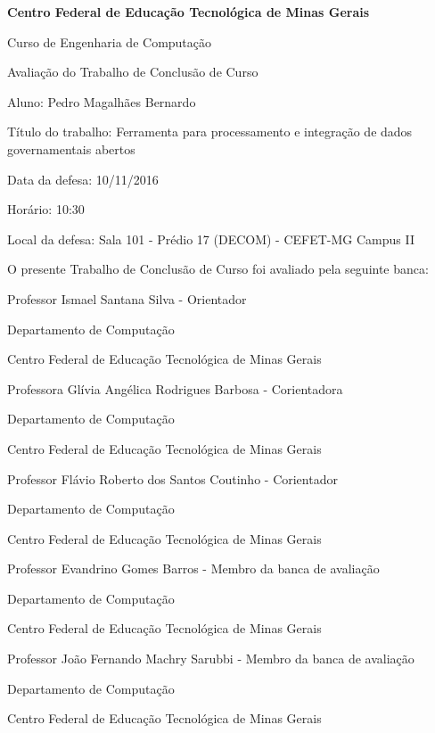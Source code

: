 \centerline{\textbf{Centro Federal de Educação Tecnológica de Minas Gerais}} 

\vspace{10px}

\centerline{Curso de Engenharia de Computação}

\vspace{10px}

\centerline{Avaliação do Trabalho de Conclusão de Curso}


\begin{flushleft}
Aluno: Pedro Magalhães Bernardo

Título do trabalho: Ferramenta para processamento e integração de dados governamentais abertos

Data da defesa: 10/11/2016

Horário: 10:30

Local da defesa: Sala 101 - Prédio 17 (DECOM) - CEFET-MG Campus II
\end{flushleft}

\vspace{10px}


\centerline{O presente Trabalho de Conclusão de Curso foi avaliado pela seguinte banca:}
\vspace{20px}

\centerline{Professor Ismael Santana Silva - Orientador}
\centerline{Departamento de Computação}
\centerline{Centro Federal de Educação Tecnológica de Minas Gerais}

\vspace{30px}

\centerline{Professora Glívia Angélica Rodrigues Barbosa - Corientadora}
\centerline{Departamento de Computação}
\centerline{Centro Federal de Educação Tecnológica de Minas Gerais}

\vspace{30px}

\centerline{Professor Flávio Roberto dos Santos Coutinho - Corientador}
\centerline{Departamento de Computação}
\centerline{Centro Federal de Educação Tecnológica de Minas Gerais}

\vspace{30px}

\centerline{Professor Evandrino Gomes Barros - Membro da banca de avaliação}
\centerline{Departamento de Computação}
\centerline{Centro Federal de Educação Tecnológica de Minas Gerais}

\vspace{30px}

\centerline{Professor João Fernando Machry Sarubbi - Membro da banca de avaliação}
\centerline{Departamento de Computação}
\centerline{Centro Federal de Educação Tecnológica de Minas Gerais}

